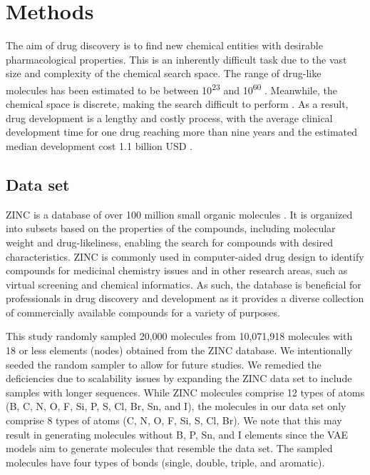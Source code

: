 \chapter{Methods}
The aim of drug discovery is to find new chemical entities with desirable pharmacological properties. This is an inherently difficult task due to the vast size and complexity of the chemical search space. The range of drug-like molecules has been estimated to be between 10\textsuperscript{23} and 10\textsuperscript{60} \cite{polishchuk2013estimation}. Meanwhile, the chemical space is discrete, making the search difficult to perform \cite{kirkpatrick2004chemical}. As a result, drug development is a lengthy and costly process, with the average clinical development time for one drug reaching more than nine years and the estimated median development cost 1.1 billion USD \cite{wouters2020estimated}.

\section{Data set}
ZINC is a database of over 100 million small organic molecules \cite{irwin2005zinc}. It is organized into subsets based on the properties of the compounds, including molecular weight and drug-likeliness, enabling the search for compounds with desired characteristics. ZINC is commonly used in computer-aided drug design to identify compounds for medicinal chemistry issues and in other research areas, such as virtual screening and chemical informatics. As such, the database is beneficial for professionals in drug discovery and development as it provides a diverse collection of commercially available compounds for a variety of purposes.

This study randomly sampled 20,000 molecules from 10,071,918 molecules with 18 or less elements (nodes) obtained from the ZINC database. We intentionally seeded the random sampler to allow for future studies. We remedied the deficiencies due to scalability issues by expanding the ZINC data set to include samples with longer sequences. While ZINC molecules comprise 12 types of atoms (B, C, N, O, F, Si, P, S, Cl, Br, Sn, and I), the molecules in our data set only comprise 8 types of atoms (C, N, O, F, Si, S, Cl, Br). We note that this may result in generating molecules without B, P, Sn, and I elements since the VAE models aim to generate molecules that resemble the data set. The sampled molecules have four types of bonds (single, double, triple, and aromatic).

